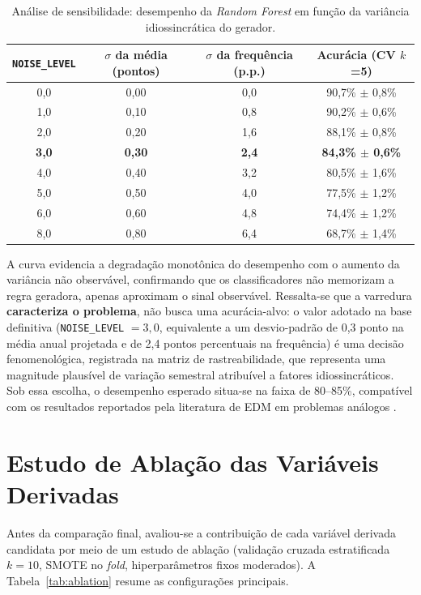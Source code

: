 \begin{table}[htb]
\centering
\caption{Análise de sensibilidade: desempenho da \textit{Random Forest} em função da variância idiossincrática do gerador.}
\label{tab:ruido}
\begin{tabular}{cccc}
\toprule
\textbf{\texttt{NOISE\_LEVEL}} & \textbf{$\sigma$ da média (pontos)} & \textbf{$\sigma$ da frequência (p.p.)} & \textbf{Acurácia (CV $k$=5)} \\
\midrule
0,0 & 0,00 & 0,0 & 90,7\% $\pm$ 0,8\% \\
1,0 & 0,10 & 0,8 & 90,2\% $\pm$ 0,6\% \\
2,0 & 0,20 & 1,6 & 88,1\% $\pm$ 0,8\% \\
\textbf{3,0} & \textbf{0,30} & \textbf{2,4} & \textbf{84,3\% $\pm$ 0,6\%} \\
4,0 & 0,40 & 3,2 & 80,5\% $\pm$ 1,6\% \\
5,0 & 0,50 & 4,0 & 77,5\% $\pm$ 1,2\% \\
6,0 & 0,60 & 4,8 & 74,4\% $\pm$ 1,2\% \\
8,0 & 0,80 & 6,4 & 68,7\% $\pm$ 1,4\% \\
\bottomrule
\end{tabular}
\end{table}

A curva evidencia a degradação monotônica do desempenho com o aumento da variância não observável, confirmando que os classificadores não memorizam a regra geradora, apenas aproximam o sinal observável. Ressalta-se que a varredura \textbf{caracteriza o problema}, não busca uma acurácia-alvo: o valor adotado na base definitiva (\texttt{NOISE\_LEVEL} $= 3{,}0$, equivalente a um desvio-padrão de 0,3 ponto na média anual projetada e de 2,4 pontos percentuais na frequência) é uma decisão fenomenológica, registrada na matriz de rastreabilidade, que representa uma magnitude plausível de variação semestral atribuível a fatores idiossincráticos. Sob essa escolha, o desempenho esperado situa-se na faixa de 80--85\%, compatível com os resultados reportados pela literatura de EDM em problemas análogos \cite{costa2012, shabnam2025}.

\section{Estudo de Ablação das Variáveis Derivadas}

Antes da comparação final, avaliou-se a contribuição de cada variável derivada candidata por meio de um estudo de ablação (validação cruzada estratificada $k=10$, SMOTE no \textit{fold}, hiperparâmetros fixos moderados). A Tabela~\ref{tab:ablation} resume as configurações principais.

